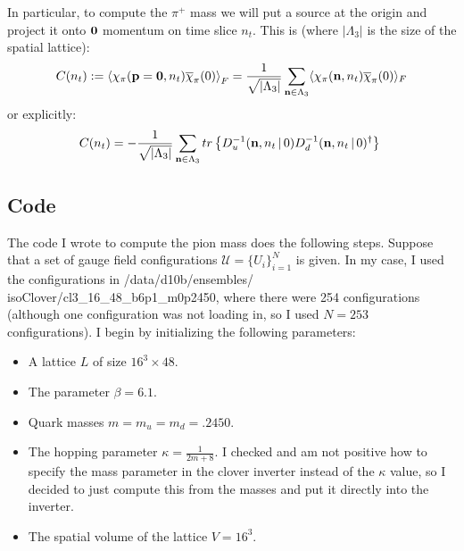 \documentclass[11pt, oneside]{article}   	%
\theoremstyle{definition}
\begin{document}
In particular, to compute the $\pi^+$ mass we will put a source at the origin and project it onto $\textbf 0$ momentum 
on time slice $n_t$. This is (where $|\Lambda_3|$ is the size of the spatial lattice):
\begin{equation}
	C(n_t) := \left\langle \chi_\pi(\textbf p = \textbf 0, n_t)\overline\chi_\pi (0)\right\rangle_F = \frac{1}{\sqrt{
	|\Lambda_3|}}\sum_{\mathbf n\in\Lambda_3}\langle \chi_\pi(\textbf n, n_t)\overline\chi_\pi(0)\rangle_F
\end{equation}
or explicitly:
\begin{equation}
	C(n_t) = -\frac{1}{\sqrt{|\Lambda_3|}}\sum_{\textbf n\in\Lambda_3} tr\left\{ D^{-1}_u (\textbf n, n_t \,|\, 0) D^{-1}_d 
	(\textbf n, n_t \,|\,0)^\dagger\right\}~
	\label{eq:zero_projection}
\end{equation}

\newpage
\subsection{Code}

The code I wrote to compute the pion mass does the following steps. Suppose that a set of gauge field 
configurations $\mathcal U = \{U_i\}_{i = 1}^N$ is given. In my case, I used the configurations in 
/data/d10b/ensembles/ isoClover/cl3\_16\_48\_b6p1\_m0p2450, where there were 254 configurations (although one 
configuration was not loading in, so I used $N = 253$ configurations). I begin by initializing the following parameters:
\begin{itemize}
	\item A lattice $L$ of size $16^3\times 48$. 
	\item The parameter $\beta = 6.1$.
	\item Quark masses $m = m_u = m_d = .2450$.
	\item The hopping parameter $\kappa = \frac{1}{2m + 8}$. I checked and am not positive how to specify the 
	mass parameter in the clover inverter instead of the $\kappa$ value, so I decided to just compute this from the 
	masses and put it directly into the inverter. 
	\item The spatial volume of the lattice $V = 16^3$.
\end{itemize}
\end{document}
